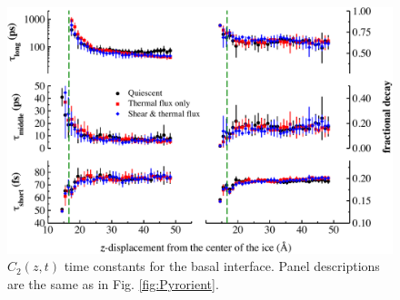 \documentclass[journal = jpccck, manuscript = suppinfo]{achemso}
\begin{document}
\begin{figure}
\includegraphics[width=\linewidth]{Bas_lcorrz}
\caption{\label{fig:Borient} $C_2(z,t)$ time constants for the basal
  interface.  Panel descriptions are the same as in
  Fig. \ref{fig:Pyrorient}. }
\end{figure}
\end{document}
